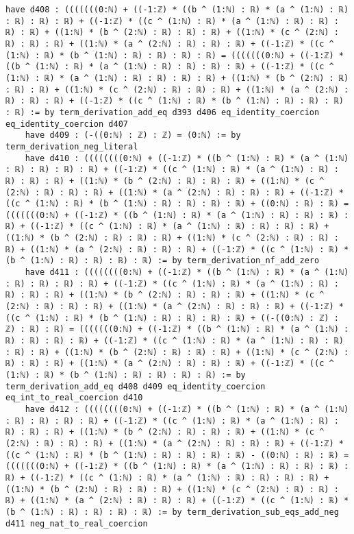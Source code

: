 \documentclass{article}
\begin{document}
\begin{tcolorbox}[colback=white!10, width=\linewidth]
\begin{lstlisting}[language=Lean4]
    have d408 : (((((((0:ℕ) + ((-1:ℤ) * ((b ^ (1:ℕ) : ℝ) * (a ^ (1:ℕ) : ℝ) : ℝ) : ℝ) : ℝ) + ((-1:ℤ) * ((c ^ (1:ℕ) : ℝ) * (a ^ (1:ℕ) : ℝ) : ℝ) : ℝ) : ℝ) + ((1:ℕ) * (b ^ (2:ℕ) : ℝ) : ℝ) : ℝ) + ((1:ℕ) * (c ^ (2:ℕ) : ℝ) : ℝ) : ℝ) + ((1:ℕ) * (a ^ (2:ℕ) : ℝ) : ℝ) : ℝ) + ((-1:ℤ) * ((c ^ (1:ℕ) : ℝ) * (b ^ (1:ℕ) : ℝ) : ℝ) : ℝ) : ℝ) = (((((((0:ℕ) + ((-1:ℤ) * ((b ^ (1:ℕ) : ℝ) * (a ^ (1:ℕ) : ℝ) : ℝ) : ℝ) : ℝ) + ((-1:ℤ) * ((c ^ (1:ℕ) : ℝ) * (a ^ (1:ℕ) : ℝ) : ℝ) : ℝ) : ℝ) + ((1:ℕ) * (b ^ (2:ℕ) : ℝ) : ℝ) : ℝ) + ((1:ℕ) * (c ^ (2:ℕ) : ℝ) : ℝ) : ℝ) + ((1:ℕ) * (a ^ (2:ℕ) : ℝ) : ℝ) : ℝ) + ((-1:ℤ) * ((c ^ (1:ℕ) : ℝ) * (b ^ (1:ℕ) : ℝ) : ℝ) : ℝ) : ℝ) := by term_derivation_add_eq d393 d406 eq_identity_coercion eq_identity_coercion d407
    have d409 : (-((0:ℕ) : ℤ) : ℤ) = (0:ℕ) := by term_derivation_neg_literal
    have d410 : ((((((((0:ℕ) + ((-1:ℤ) * ((b ^ (1:ℕ) : ℝ) * (a ^ (1:ℕ) : ℝ) : ℝ) : ℝ) : ℝ) + ((-1:ℤ) * ((c ^ (1:ℕ) : ℝ) * (a ^ (1:ℕ) : ℝ) : ℝ) : ℝ) : ℝ) + ((1:ℕ) * (b ^ (2:ℕ) : ℝ) : ℝ) : ℝ) + ((1:ℕ) * (c ^ (2:ℕ) : ℝ) : ℝ) : ℝ) + ((1:ℕ) * (a ^ (2:ℕ) : ℝ) : ℝ) : ℝ) + ((-1:ℤ) * ((c ^ (1:ℕ) : ℝ) * (b ^ (1:ℕ) : ℝ) : ℝ) : ℝ) : ℝ) + ((0:ℕ) : ℝ) : ℝ) = (((((((0:ℕ) + ((-1:ℤ) * ((b ^ (1:ℕ) : ℝ) * (a ^ (1:ℕ) : ℝ) : ℝ) : ℝ) : ℝ) + ((-1:ℤ) * ((c ^ (1:ℕ) : ℝ) * (a ^ (1:ℕ) : ℝ) : ℝ) : ℝ) : ℝ) + ((1:ℕ) * (b ^ (2:ℕ) : ℝ) : ℝ) : ℝ) + ((1:ℕ) * (c ^ (2:ℕ) : ℝ) : ℝ) : ℝ) + ((1:ℕ) * (a ^ (2:ℕ) : ℝ) : ℝ) : ℝ) + ((-1:ℤ) * ((c ^ (1:ℕ) : ℝ) * (b ^ (1:ℕ) : ℝ) : ℝ) : ℝ) : ℝ) := by term_derivation_nf_add_zero
    have d411 : ((((((((0:ℕ) + ((-1:ℤ) * ((b ^ (1:ℕ) : ℝ) * (a ^ (1:ℕ) : ℝ) : ℝ) : ℝ) : ℝ) + ((-1:ℤ) * ((c ^ (1:ℕ) : ℝ) * (a ^ (1:ℕ) : ℝ) : ℝ) : ℝ) : ℝ) + ((1:ℕ) * (b ^ (2:ℕ) : ℝ) : ℝ) : ℝ) + ((1:ℕ) * (c ^ (2:ℕ) : ℝ) : ℝ) : ℝ) + ((1:ℕ) * (a ^ (2:ℕ) : ℝ) : ℝ) : ℝ) + ((-1:ℤ) * ((c ^ (1:ℕ) : ℝ) * (b ^ (1:ℕ) : ℝ) : ℝ) : ℝ) : ℝ) + ((-((0:ℕ) : ℤ) : ℤ) : ℝ) : ℝ) = (((((((0:ℕ) + ((-1:ℤ) * ((b ^ (1:ℕ) : ℝ) * (a ^ (1:ℕ) : ℝ) : ℝ) : ℝ) : ℝ) + ((-1:ℤ) * ((c ^ (1:ℕ) : ℝ) * (a ^ (1:ℕ) : ℝ) : ℝ) : ℝ) : ℝ) + ((1:ℕ) * (b ^ (2:ℕ) : ℝ) : ℝ) : ℝ) + ((1:ℕ) * (c ^ (2:ℕ) : ℝ) : ℝ) : ℝ) + ((1:ℕ) * (a ^ (2:ℕ) : ℝ) : ℝ) : ℝ) + ((-1:ℤ) * ((c ^ (1:ℕ) : ℝ) * (b ^ (1:ℕ) : ℝ) : ℝ) : ℝ) : ℝ) := by term_derivation_add_eq d408 d409 eq_identity_coercion eq_int_to_real_coercion d410
    have d412 : ((((((((0:ℕ) + ((-1:ℤ) * ((b ^ (1:ℕ) : ℝ) * (a ^ (1:ℕ) : ℝ) : ℝ) : ℝ) : ℝ) + ((-1:ℤ) * ((c ^ (1:ℕ) : ℝ) * (a ^ (1:ℕ) : ℝ) : ℝ) : ℝ) : ℝ) + ((1:ℕ) * (b ^ (2:ℕ) : ℝ) : ℝ) : ℝ) + ((1:ℕ) * (c ^ (2:ℕ) : ℝ) : ℝ) : ℝ) + ((1:ℕ) * (a ^ (2:ℕ) : ℝ) : ℝ) : ℝ) + ((-1:ℤ) * ((c ^ (1:ℕ) : ℝ) * (b ^ (1:ℕ) : ℝ) : ℝ) : ℝ) : ℝ) - ((0:ℕ) : ℝ) : ℝ) = (((((((0:ℕ) + ((-1:ℤ) * ((b ^ (1:ℕ) : ℝ) * (a ^ (1:ℕ) : ℝ) : ℝ) : ℝ) : ℝ) + ((-1:ℤ) * ((c ^ (1:ℕ) : ℝ) * (a ^ (1:ℕ) : ℝ) : ℝ) : ℝ) : ℝ) + ((1:ℕ) * (b ^ (2:ℕ) : ℝ) : ℝ) : ℝ) + ((1:ℕ) * (c ^ (2:ℕ) : ℝ) : ℝ) : ℝ) + ((1:ℕ) * (a ^ (2:ℕ) : ℝ) : ℝ) : ℝ) + ((-1:ℤ) * ((c ^ (1:ℕ) : ℝ) * (b ^ (1:ℕ) : ℝ) : ℝ) : ℝ) : ℝ) := by term_derivation_sub_eqs_add_neg d411 neg_nat_to_real_coercion

\end{lstlisting}
\end{tcolorbox}
\end{document}

